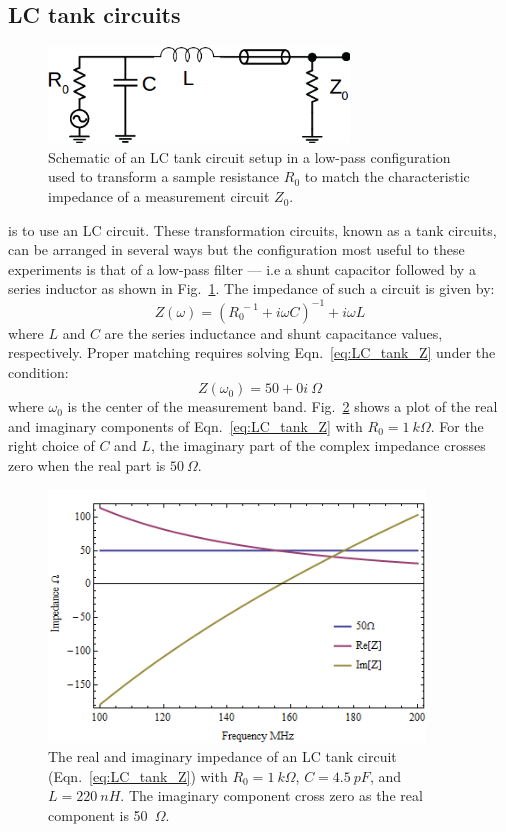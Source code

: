 \subsection{LC tank circuits}
\begin{figure}
\centering
\includegraphics[width=80mm]{figures/Johnson_noise_thermometry/schematic_matching.png}
\caption{Schematic of an LC tank circuit setup in a low-pass configuration used to transform a sample resistance $R_0$ to match the characteristic impedance of a measurement circuit $Z_0$.}
\label{fig:schematic_matching}
\end{figure}
 is to use an LC circuit. These transformation circuits, known as a tank circuits, can be arranged in several ways but the configuration most useful to these experiments is that of a low-pass filter --- i.e a shunt capacitor followed by a series inductor as shown in Fig.~\ref{fig:schematic_matching}. The impedance of such a circuit is given by:
\begin{equation}\label{eq:LC_tank_Z}
Z(\omega) = \left(R_0^{~-1}+i\omega C\right)^{-1}+i\omega L
\end{equation}
where $L$ and $C$ are the series inductance and shunt capacitance values, respectively. Proper matching requires solving Eqn.~\ref{eq:LC_tank_Z} under the condition:
\begin{equation}\label{eq:LC_tank_constraint}
Z(\omega_0) = 50+0i~\Omega 
\end{equation}
where $\omega_0$ is the center of the measurement band. Fig.~\ref{fig:LC_tank_Z} shows a plot of the real and imaginary components of Eqn.~\ref{eq:LC_tank_Z} with $R_0 = 1~k\Omega$. For the right choice of $C$ and $L$, the imaginary part of the complex impedance crosses zero when the real part is $50~\Omega$.
\begin{figure}
\centering
\includegraphics[width=100mm]{figures/Johnson_noise_thermometry/Impedance_matching2.png}
\caption{The real and imaginary impedance of an LC tank circuit (Eqn.~\ref{eq:LC_tank_Z}) with $R_0=1~k\Omega$, $C = 4.5~pF$, and $L = 220~nH$. The imaginary component cross zero as the real component is 50~$\Omega$.}
\label{fig:LC_tank_Z}
\end{figure}
